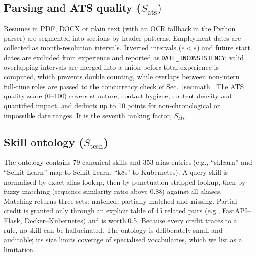 \documentclass[conference]{IEEEtran}
\newcommand{\flag}[1]{\texttt{\footnotesize #1}}
\begin{document}
\subsection{Parsing and ATS quality ($S_{\mathrm{ats}}$)}
Resumes in PDF, DOCX or plain text (with an OCR fallback in the Python parser) are segmented into sections by header patterns. Employment dates are collected as month-resolution intervals. Inverted intervals ($e<s$) and future start dates are excluded from experience and reported as \flag{DATE\_INCONSISTENCY}; valid overlapping intervals are merged into a union before total experience is computed, which prevents double counting, while overlaps between non-intern full-time roles are passed to the concurrency check of Sec.~\ref{sec:math}. The ATS quality score (0--100) covers structure, contact hygiene, content density and quantified impact, and deducts up to 10 points for non-chronological or impossible date ranges. It is the seventh ranking factor, $S_{\mathrm{ats}}$.

\subsection{Skill ontology ($S_{\mathrm{tech}}$)}
The ontology contains 79 canonical skills and 353 alias entries (e.g., ``sklearn'' and ``Scikit Learn'' map to Scikit-Learn, ``k8s'' to Kubernetes). A query skill is normalised by exact alias lookup, then by punctuation-stripped lookup, then by fuzzy matching (sequence-similarity ratio above 0.88) against all aliases. Matching returns three sets: matched, partially matched and missing. Partial credit is granted only through an explicit table of 15 related pairs (e.g., FastAPI--Flask, Docker--Kubernetes) and is worth 0.5. Because every credit traces to a rule, no skill can be hallucinated. The ontology is deliberately small and auditable; its size limits coverage of specialised vocabularies, which we list as a limitation.
\end{document}
